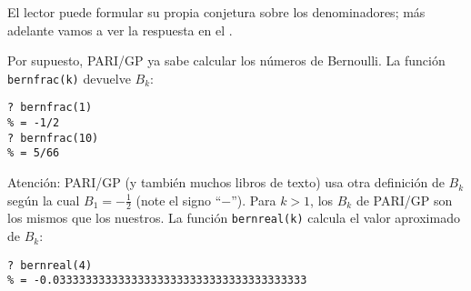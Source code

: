 \documentclass{article}
\begin{document}
El lector puede formular su propia conjetura sobre los denominadores; más adelante vamos a ver la respuesta en el .

\begin{shaded}
\small\noindent Por supuesto, PARI/GP ya sabe calcular los números de Bernoulli. La función \verb|bernfrac(k)| devuelve $B_k$:

\begin{verbatim}
? bernfrac(1)
% = -1/2
? bernfrac(10)
% = 5/66
\end{verbatim}

\noindent Atención: PARI/GP (y también muchos libros de texto) usa otra definición de $B_k$ según la cual $B_1 = -\frac{1}{2}$ (note el signo ``$-$''). Para $k > 1$, los $B_k$ de PARI/GP son los mismos que los nuestros. La función \verb|bernreal(k)| calcula el valor aproximado de $B_k$:

\begin{verbatim}
? bernreal(4)   
% = -0.033333333333333333333333333333333333333
\end{verbatim}
\end{shaded}
\end{document}

